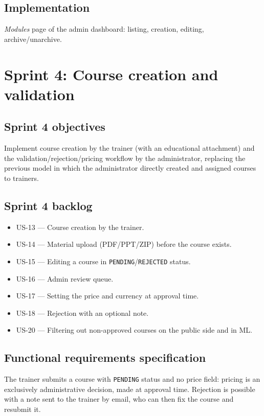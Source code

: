 \documentclass[a4paper,12pt]{report}
\begin{document}
\subsection{Implementation}
\emph{Modules} page of the admin dashboard: listing, creation, editing,
archive/unarchive.

\section{Sprint 4: Course creation and validation}

\subsection{Sprint 4 objectives}
Implement course creation by the trainer (with an educational attachment)
and the validation/rejection/pricing workflow by the administrator,
replacing the previous model in which the administrator directly created
and assigned courses to trainers.

\subsection{Sprint 4 backlog}
\begin{itemize}[leftmargin=*]
  \item US-13 --- Course creation by the trainer.
  \item US-14 --- Material upload (PDF/PPT/ZIP) before the course exists.
  \item US-15 --- Editing a course in \texttt{PENDING}/\texttt{REJECTED} status.
  \item US-16 --- Admin review queue.
  \item US-17 --- Setting the price and currency at approval time.
  \item US-18 --- Rejection with an optional note.
  \item US-20 --- Filtering out non-approved courses on the public side and in ML.
\end{itemize}

\subsection{Functional requirements specification}
The trainer submits a course with \texttt{PENDING} status and no price
field: pricing is an exclusively administrative decision, made at approval
time. Rejection is possible with a note sent to the trainer by email, who
can then fix the course and resubmit it.
\end{document}
